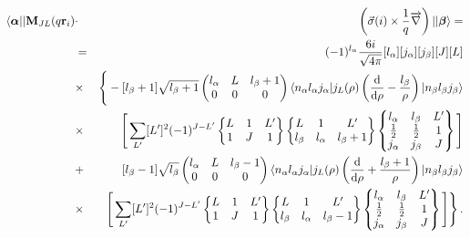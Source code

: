 \documentclass[11pt,a4paper]{article}
\begin{document}
\begin{eqnarray}
\label{eq:m4}
\langle \boldsymbol{\alpha}||{\bf{M}}_{JL}(q{\bf{r}}_i)&\cdot&\left({\vec{\sigma}(i)}\times\frac{1}{q} \overrightarrow{\nabla}\right)||\boldsymbol{\beta}\rangle = \nonumber\\ 
&=& (-1)^{l_\alpha}\frac{6i}{\sqrt{4\pi}}[l_\alpha][j_\alpha][j_\beta][J][L] \nonumber\\
&\times& \Bigg\{-[l_\beta+1]\sqrt{l_\beta+1}
\begin{pmatrix}
    l_\alpha&L&l_\beta+1\\
    0&0&0
  \end{pmatrix}
 \langle n_\alpha l_\alpha j_\alpha |j_{L}(\rho)\left(\frac{\text{d}}{\text{d}\rho}-\frac{l_\beta}{\rho}\right)|n_\beta l_\beta j_\beta \rangle  \nonumber\\
&\times&\Bigg[ \sum_{L'} [L']^{2} (-1)^{J-L'}
  \begin{Bmatrix}
    L&1&L'\\
    1&J&1
  \end{Bmatrix}\begin{Bmatrix}
    L&1&L'\\
    l_\beta&l_\alpha&l_\beta+1
  \end{Bmatrix}\begin{Bmatrix}
    l_\alpha&l_\beta&L'\\
    \frac{1}{2}&\frac{1}{2}&1\\
    j_\alpha&j_\beta&J
  \end{Bmatrix} \Bigg] \nonumber\\
&+& [l_\beta-1]\sqrt{l_\beta}
\begin{pmatrix}
    l_\alpha&L&l_\beta-1\\
    0&0&0
  \end{pmatrix}
  \langle n_\alpha l_\alpha j_\alpha|j_{L}(\rho)\left(\frac{\text{d}}{\text{d}\rho}+\frac{l_\beta+1}{\rho}\right)|n_\beta l_\beta j_\beta\rangle \nonumber \\
&\times& \Bigg[  \sum_{L'} [L']^{2} (-1)^{J-L'}
  \begin{Bmatrix}
    L&1&L'\\
    1&J&1
  \end{Bmatrix}\begin{Bmatrix}
    L&1&L'\\
    l_\beta&l_\alpha&l_\beta-1
  \end{Bmatrix}\begin{Bmatrix}
    l_\alpha&l_\beta&L'\\
    \frac{1}{2}&\frac{1}{2}&1\\
    j_\alpha&j_\beta&J
  \end{Bmatrix} 
\Bigg]\Bigg\} \,. \nonumber\\
\end{eqnarray}
\end{document}
